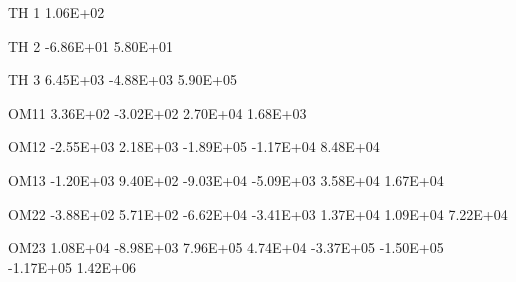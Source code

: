 \documentclass[
  11pt,
  krantz2, a4paper, twoside]{krantz}
\newenvironment{Shaded}{\begin{snugshade}}{\end{snugshade}}
\newcommand{\DecValTok}[1]{\textcolor[rgb]{0.00,0.00,0.81}{#1}}
\newcommand{\FloatTok}[1]{\textcolor[rgb]{0.00,0.00,0.81}{#1}}
\newcommand{\NormalTok}[1]{#1}
\theoremstyle{definition}
\theoremstyle{definition}
\theoremstyle{definition}
\theoremstyle{remark}
\begin{document}
\begin{Shaded}
\begin{Highlighting}[]
                                                                                                       
\NormalTok{TH }\DecValTok{1}    \FloatTok{1.06E+02}                                                                                       
                                                                                                       
\NormalTok{TH }\DecValTok{2}   \FloatTok{{-}6.86E+01}  \FloatTok{5.80E+01}                                                                             
                                                                                                       
\NormalTok{TH }\DecValTok{3}    \FloatTok{6.45E+03} \FloatTok{{-}4.88E+03}  \FloatTok{5.90E+05}                                                                   
                                                                                                       
\NormalTok{OM11    }\FloatTok{3.36E+02} \FloatTok{{-}3.02E+02}  \FloatTok{2.70E+04}  \FloatTok{1.68E+03}                                                         
                                                                                                       
\NormalTok{OM12   }\FloatTok{{-}2.55E+03}  \FloatTok{2.18E+03} \FloatTok{{-}1.89E+05} \FloatTok{{-}1.17E+04}  \FloatTok{8.48E+04}                                               
                                                                                                       
\NormalTok{OM13   }\FloatTok{{-}1.20E+03}  \FloatTok{9.40E+02} \FloatTok{{-}9.03E+04} \FloatTok{{-}5.09E+03}  \FloatTok{3.58E+04}  \FloatTok{1.67E+04}                                     
                                                                                                       
\NormalTok{OM22   }\FloatTok{{-}3.88E+02}  \FloatTok{5.71E+02} \FloatTok{{-}6.62E+04} \FloatTok{{-}3.41E+03}  \FloatTok{1.37E+04}  \FloatTok{1.09E+04}  \FloatTok{7.22E+04}                           
                                                                                                       
\NormalTok{OM23    }\FloatTok{1.08E+04} \FloatTok{{-}8.98E+03}  \FloatTok{7.96E+05}  \FloatTok{4.74E+04} \FloatTok{{-}3.37E+05} \FloatTok{{-}1.50E+05} \FloatTok{{-}1.17E+05}  \FloatTok{1.42E+06}                 
                                                                                                       

\end{Highlighting}
\end{Shaded}
\end{document}
